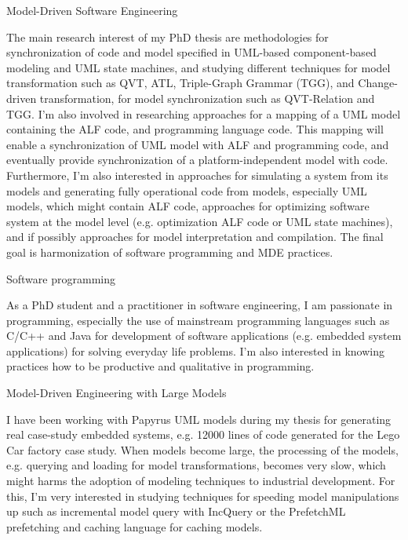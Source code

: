 \begin{cventries}

\cvinterest
{Model-Driven Software Engineering}
{
	\begin{cvitems}
	\item{The main research interest of my PhD thesis are methodologies for synchronization of code and model specified in UML-based component-based modeling and UML state machines, and studying different techniques for model transformation such as QVT, ATL, Triple-Graph Grammar (TGG), and Change-driven transformation, for model synchronization such as QVT-Relation and TGG.	
I'm also involved in researching approaches for a mapping of a UML model containing the ALF code, and programming language code.
This mapping will enable a synchronization of UML model with ALF and programming code, and eventually provide synchronization of a platform-independent model with code.
Furthermore, I'm also interested in approaches for simulating a system from its models and generating fully operational code from models, especially UML models, which might contain ALF code, approaches for optimizing software system at the model level (e.g. optimization ALF code or UML state machines), and if possibly approaches for model interpretation and compilation.
The final goal is harmonization of software programming and MDE practices.}
\end{cvitems}}

\cvinterest
{Software programming}
{
	\begin{cvitems}
		\item{As a PhD student and a practitioner in software engineering, I am passionate in programming, especially the use of mainstream programming languages such as C/C++ and Java for development of software applications (e.g. embedded system applications) for solving everyday life problems. I'm also interested in knowing practices how to be productive and qualitative in programming.}
	\end{cvitems}
}


\cvinterest
{Model-Driven Engineering with Large Models}
{
	\begin{cvitems}
		\item {I have been working with Papyrus UML models during my thesis for generating real case-study embedded systems, e.g. 12000 lines of code generated for the Lego Car factory case study. When models become large, the processing of the models, e.g. querying and loading for model transformations, becomes very slow, which might harms the adoption of modeling techniques to industrial development. For this, I'm very interested in studying techniques for speeding model manipulations up such as incremental model query with IncQuery or the PrefetchML prefetching and caching language for caching models.}
	\end{cvitems}
}


\end{cventries}
